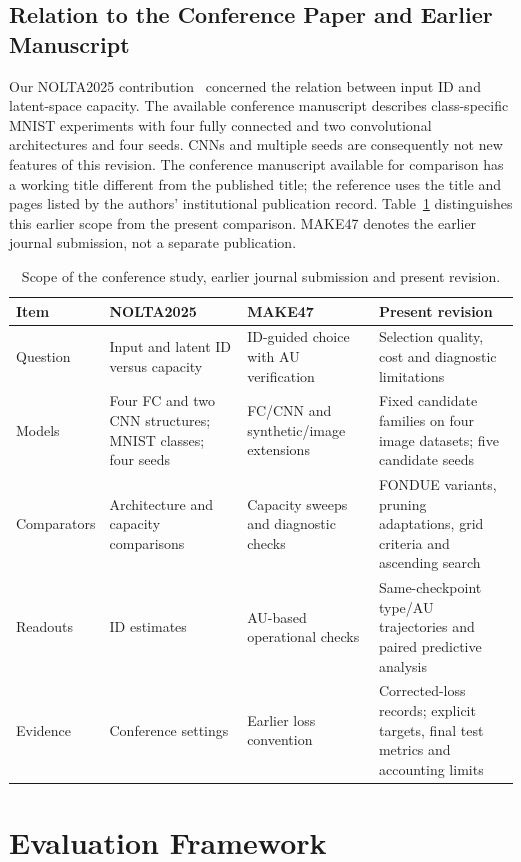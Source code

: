 \documentclass[make,article,submit,pdftex,moreauthors]{Definitions/mdpi}
\begin{document}
\subsection{Relation to the Conference Paper and Earlier Manuscript}
Our NOLTA2025 contribution~\cite{obata2025manifold} concerned the relation
between input ID and latent-space capacity. The available conference
manuscript describes class-specific MNIST experiments with four fully
connected and two convolutional architectures and four seeds. CNNs and
multiple seeds are consequently not new features of this revision.
The conference manuscript available for comparison has a working title
different from the published title; the reference uses the title and
pages listed by the authors' institutional publication record.
Table~\ref{tab:history} distinguishes this earlier scope from the present
comparison. MAKE47 denotes the earlier journal submission, not a separate
publication.

\begin{table}[H]
\caption{Scope of the conference study, earlier journal submission and present revision.}
\label{tab:history}\small
\begin{tabularx}{\textwidth}{lXXX}\toprule
Item & NOLTA2025 & MAKE47 & Present revision \\\midrule
Question & Input and latent ID versus capacity & ID-guided choice with AU verification & Selection quality, cost and diagnostic limitations \\
Models & Four FC and two CNN structures; MNIST classes; four seeds & FC/CNN and synthetic/image extensions & Fixed candidate families on four image datasets; five candidate seeds \\
Comparators & Architecture and capacity comparisons & Capacity sweeps and diagnostic checks & FONDUE variants, pruning adaptations, grid criteria and ascending search \\
Readouts & ID estimates & AU-based operational checks & Same-checkpoint type/AU trajectories and paired predictive analysis \\
Evidence & Conference settings & Earlier loss convention & Corrected-loss records; explicit targets, final test metrics and accounting limits \\
\bottomrule\end{tabularx}
\end{table}

\section{Evaluation Framework}\label{sec:framework}
\end{document}
